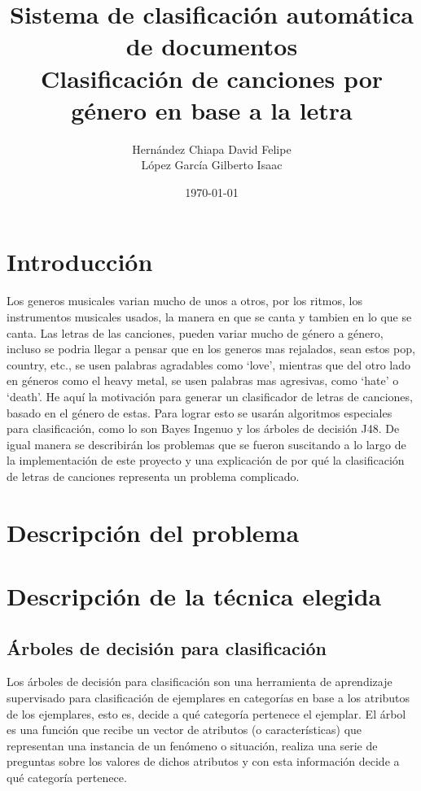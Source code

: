 \documentclass[spanish,11pt,letterpaper]{article}
\title{Sistema de clasificación automática de documentos\\
Clasificación de canciones por género en base a la letra}
\author{Hernández Chiapa David Felipe\\
López García Gilberto Isaac}
\affil{Facultad de Ciencias\\{\small Universidad Nacional Autónoma de México}}
\date{\small\today}
\begin{document}
\maketitle

\section{Introducción}

Los generos musicales varian mucho de unos a otros, por los ritmos, los instrumentos musicales
usados, la manera en que se canta y tambien en lo que se canta. Las letras de las canciones, pueden
variar mucho de género a género, incluso se podria llegar a pensar que en los generos mas
rejalados, sean estos pop, country, etc., se usen palabras agradables como ‘love’, mientras que del
otro lado en géneros como el heavy metal, se usen palabras mas agresivas, como ‘hate’ o ‘death’.
 He aquí la motivación para generar un clasificador de letras de canciones, basado en el género de
estas. Para lograr esto se usarán algoritmos especiales para clasificación, como lo son Bayes
Ingenuo y los árboles de decisión J48. De igual manera se describirán los problemas que se
fueron suscitando a lo largo de la implementación de este proyecto y una explicación de por qué
la clasificación de letras de canciones representa un problema complicado.

\section{Descripción del problema}

\section{Descripción de la técnica elegida}

\subsection{Árboles de decisión para clasificación}

Los árboles de decisión para clasificación son una herramienta de aprendizaje
supervisado para clasificación de ejemplares en categorías en base a los
atributos de los ejemplares, esto es, decide a qué categoría pertenece el
ejemplar. El árbol es una función que recibe un vector de atributos (o características) que
representan una instancia de un fenómeno o situación, realiza una serie de
preguntas sobre los valores de dichos atributos y con esta información
decide a qué categoría pertenece.
\end{document}
